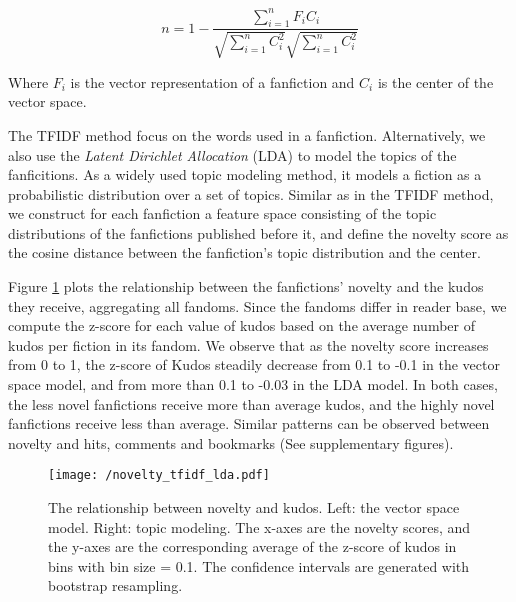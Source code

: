 \documentclass[a4paper]{article}
\begin{document}
\begin{equation}
n = 1-\frac{\sum_{i=1}^{n}{F_iC_i}}{\sqrt{\sum_{i=1}^{n}{C_i^2}}\sqrt{\sum_{i=1}^{n}{C_i^2}}}
\end{equation}

Where $F_i$ is the vector representation of a fanfiction and $C_i$ is the center of the vector space.

The TFIDF method focus on the words used in a fanfiction. Alternatively, we also use the \emph{Latent Dirichlet Allocation} (LDA) \cite{blei2003latent} to model the topics of the fanficitions. As a widely used topic modeling method, it models a fiction as a probabilistic distribution over a set of topics. Similar as in the TFIDF method, we construct for each fanfiction a feature space consisting of the topic distributions of the fanfictions published before it, and define the novelty score as the cosine distance between the fanfiction's topic distribution and the center. 

Figure \ref{fig:tfidf_lda_kudos} plots the relationship between the fanfictions' novelty and the kudos they receive, aggregating all fandoms. Since the fandoms differ in reader base, we compute the z-score for each value of kudos based on the average number of kudos per fiction in its fandom. We observe that as the novelty score increases from 0  to 1, the z-score of Kudos steadily decrease from 0.1 to -0.1 in the vector space model, and from more than 0.1 to -0.03 in the LDA model. In both cases, the less novel fanfictions receive more than average kudos, and the highly novel fanfictions receive less than average. Similar patterns can be observed between novelty and hits, comments and bookmarks (See supplementary figures).

\begin{figure}
    \centering
          \texttt{[image: /novelty\_tfidf\_lda.pdf]}
        \caption{The relationship between novelty and kudos. Left: the vector space model. Right: topic modeling. The x-axes are the novelty scores, and the y-axes are the corresponding average of the z-score of kudos in bins with bin size = 0.1. The confidence intervals are generated with bootstrap resampling. }
        \label{fig:tfidf_lda_kudos}
\end{figure}
\end{document}

